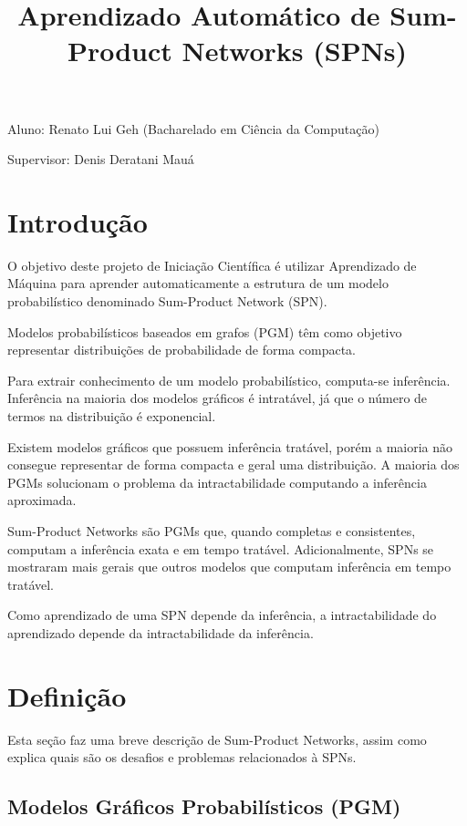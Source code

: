 \documentclass[a4paper,10pt]{article}
\title{\textbf{Aprendizado Automático de Sum-Product Networks (SPNs)}}
\theoremstyle{plain}
\begin{document}
\date{}
\author{}
\vspace*{-40pt}
{\let\newpage\relax\maketitle}

Aluno: Renato Lui Geh (Bacharelado em Ciência da Computação)

Supervisor: Denis Deratani Mauá

\section{Introdução}

O objetivo deste projeto de Iniciação Científica é utilizar Aprendizado de Máquina para aprender
automaticamente a estrutura de um modelo probabilístico denominado Sum-Product Network (SPN).

Modelos probabilísticos baseados em grafos (PGM) têm como objetivo representar distribuições de
probabilidade de forma compacta.

Para extrair conhecimento de um modelo probabilístico, computa-se inferência. Inferência na
maioria dos modelos gráficos é intratável, já que o número de termos na distribuição é exponencial.

Existem modelos gráficos que possuem inferência tratável, porém a maioria não consegue representar
de forma compacta e geral uma distribuição. A maioria dos PGMs solucionam o problema da
intractabilidade computando a inferência aproximada.

Sum-Product Networks são PGMs que, quando completas e consistentes, computam a inferência exata e
em tempo tratável. Adicionalmente, SPNs se mostraram mais gerais que outros modelos que computam
inferência em tempo tratável.\cite{poon-domingos}

Como aprendizado de uma SPN depende da inferência, a intractabilidade do aprendizado depende da
intractabilidade da inferência.

\section{Definição}

Esta seção faz uma breve descrição de Sum-Product Networks, assim como explica quais são os
desafios e problemas relacionados à SPNs.

\subsection{Modelos Gráficos Probabilísticos (PGM)}
\end{document}
